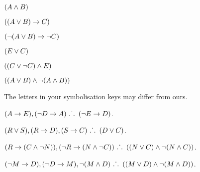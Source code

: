 \documentclass[PHIL101-Textbook.tex]{subfiles}
\begin{document}
\pagebreak
{}
\begin{earg}
\item %
$(A \land B)$
\item %
$((A \vee B) \rightarrow C)$
\item %
$(\neg(A \vee B) \rightarrow \neg C)$
\item %
$(E \vee C)$
\item %
$((C \vee \neg C) \land E)$
\item %
$((A \vee B) \land \neg(A \land B))$
\end{earg}




The letters in your symbolisation keys may differ from ours.
\begin{earg}
\item $(A \rightarrow E), (\neg D \rightarrow A) \ \ldotp\dot{}\,\ldotp \ (\neg E \rightarrow D)$. %
\item $(R \eor S), (R \eif D), (S \eif C)\ \therefore \ (D \eor C)$. %
\item $(R \rightarrow (C \land \neg N)), (\neg R \rightarrow (N \land \neg C))\ \ldotp\dot{}\,\ldotp \ ((N \vee C) \land \neg (N \land C))$. %
\item $(\neg M \rightarrow D), (\neg D \rightarrow M), \neg (M \land D)\ \ldotp\dot{}\,\ldotp \ ((M \vee D)\land \neg (M \land D))$.  %
\end{earg}
\end{document}
